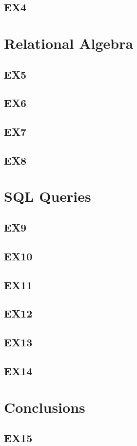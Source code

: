 \documentclass{article}
\begin{document}
	\subsection{EX4}
	
	\section{Relational Algebra}
	
	\subsection{EX5}
	
	\subsection{EX6}
	
	\subsection{EX7}
	
	\subsection{EX8}
	
	\section{SQL Queries}
	
	\subsection{EX9}
	
	\subsection{EX10}
	
	\subsection{EX11}
		
	\subsection{EX12}
	
	\subsection{EX13}
	
	\subsection{EX14}
	
	\section{Conclusions}
	
	\subsection{EX15}
\end{document}
